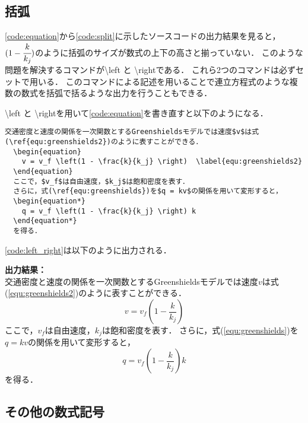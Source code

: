 \subsection{括弧}

\code\ref{code:equation}から\code\ref{code:split}に示したソースコードの出力結果を見ると，$(1 - \cfrac{k}{k_j})$のように括弧のサイズが数式の上下の高さと揃っていない．
このような問題を解決するコマンドが\textbackslash left と \textbackslash rightである．
これら2つのコマンドは必ずセットで用いる．
このコマンドによる記述を用いることで連立方程式のような複数の数式を括弧で括るような出力を行うこともできる．

\textbackslash left と \textbackslash rightを用いて\code\ref{code:equation}を書き直すと以下のようになる．

\begin{lstlisting}[caption=left/rightコマンド,label=code:left_right]
  交通密度と速度の関係を一次関数とするGreenshieldsモデルでは速度$v$は式(\ref{equ:greenshields2})のように表すことができる．
  \begin{equation}
    v = v_f \left(1 - \frac{k}{k_j} \right)  \label{equ:greenshields2}
  \end{equation}
  ここで，$v_f$は自由速度，$k_j$は飽和密度を表す．
  さらに，式(\ref{equ:greenshields})を$q = kv$の関係を用いて変形すると，
  \begin{equation*}
    q = v_f \left(1 - \frac{k}{k_j} \right) k 
  \end{equation*}
  を得る．
\end{lstlisting}
\code\ref{code:left_right}は以下のように出力される．

\noindent\textbf{出力結果：}\hrulefill\\
  交通密度と速度の関係を一次関数とするGreenshieldsモデルでは速度$v$は式(\ref{equ:greenshields2})のように表すことができる．
  \begin{equation}
    v = v_f \left(1 - \frac{k}{k_j} \right)  \label{equ:greenshields2}
  \end{equation}
  ここで，$v_f$は自由速度，$k_j$は飽和密度を表す．
  さらに，式(\ref{equ:greenshields})を$q = kv$の関係を用いて変形すると，
  \begin{equation*}
    q = v_f \left(1 - \frac{k}{k_j} \right) k 
  \end{equation*}
  を得る．
\\\noindent\hrulefill 

\subsection{その他の数式記号}

